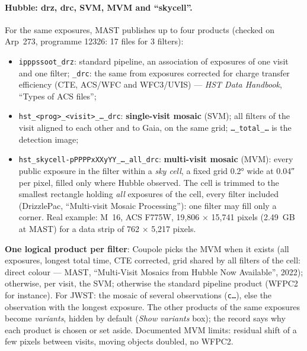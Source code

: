 \paragraph{Hubble: drz, drc, SVM, MVM and ``skycell''.} For the same exposures, MAST publishes up to four products
(checked on Arp~273, programme 12326: 17 files for 3 filters):
\begin{itemize}
\item \texttt{ipppssoot\_drz}: standard pipeline, an association of exposures of one visit and one filter;
  \texttt{\_drc}: the same from exposures corrected for charge transfer efficiency (CTE, ACS/WFC and WFC3/UVIS) ---
  \emph{HST Data Handbook}, ``Types of ACS files'';
\item \texttt{hst\_<prog>\_<visit>\_…\_drc}: \textbf{single-visit mosaic} (SVM); all filters of the visit aligned to
  each other and to Gaia, on the same grid; \texttt{…\_total\_…} is the detection image;
\item \texttt{hst\_skycell-pPPPPxXXyYY\_…\_all\_drc}: \textbf{multi-visit mosaic} (MVM): every public exposure in the
  filter within a \emph{sky cell}, a fixed grid 0.2° wide at 0.04″ per pixel, filled only where Hubble observed. The
  cell is trimmed to the smallest rectangle holding \emph{all} exposures of the cell, every filter included
  (DrizzlePac, ``Multi-visit Mosaic Processing''): one filter may fill only a corner. Real example: M~16, ACS F775W,
  19,806 × 15,741 pixels (2.49~GB at MAST) for a data strip of 762 × 5,217 pixels.
\end{itemize}
\textbf{One logical product per filter}: Coupole picks the MVM when it exists (all exposures, longest total time, CTE
corrected, grid shared by all filters of the cell: direct colour --- MAST, ``Multi-Visit Mosaics from Hubble Now
Available'', 2022); otherwise, per visit, the SVM; otherwise the standard pipeline product (WFPC2 for instance). For
JWST: the mosaic of several observations (\texttt{c…}), else the observation with the longest exposure. The other
products of the same exposures become \emph{variants}, hidden by default (\emph{Show variants} box); the record says
why each product is chosen or set aside. Documented MVM limits: residual shift of a few pixels between visits, moving
objects doubled, no WFPC2.

